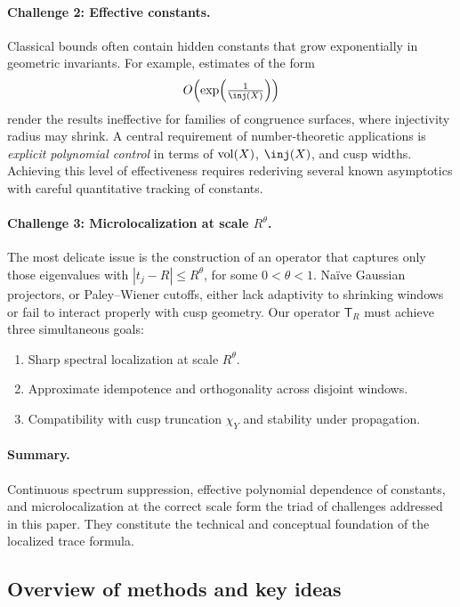 \paragraph{Challenge 2: Effective constants.}  
Classical bounds often contain hidden constants that grow exponentially in geometric
invariants. For example, estimates of the form
\[
O\!\left( \exp\!\left( \tfrac{1}{\inj(X)} \right) \right)
\]
render the results ineffective for families of congruence surfaces, where injectivity
radius may shrink.  
A central requirement of number-theoretic applications is \emph{explicit polynomial
control} in terms of $\operatorname{vol}(X)$, $\inj(X)$, and cusp widths. Achieving this level of
effectiveness requires rederiving several known asymptotics with careful quantitative
tracking of constants.

\paragraph{Challenge 3: Microlocalization at scale $R^\theta$.}  
The most delicate issue is the construction of an operator that captures only those
eigenvalues with $|t_j - R| \leq R^\theta$, for some $0<\theta<1$.  
Naïve Gaussian projectors, or Paley–Wiener cutoffs, either lack adaptivity to shrinking
windows or fail to interact properly with cusp geometry.  
Our operator $\mathsf{T}_R$ must achieve three simultaneous goals:
\begin{enumerate}
  \item Sharp spectral localization at scale $R^\theta$.
  \item Approximate idempotence and orthogonality across disjoint windows.
  \item Compatibility with cusp truncation $\chi_Y$ and stability under propagation.
\end{enumerate}

\paragraph{Summary.}  
Continuous spectrum suppression, effective polynomial dependence of constants, and
microlocalization at the correct scale form the triad of challenges addressed in this
paper. They constitute the technical and conceptual foundation of the localized trace
formula.

\subsection{Overview of methods and key ideas}\label{subsec:methods}

